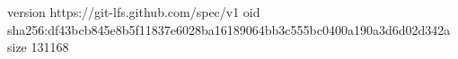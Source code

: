 version https://git-lfs.github.com/spec/v1
oid sha256:df43bcb845e8b5f11837e6028ba16189064bb3c555bc0400a190a3d6d02d342a
size 131168

